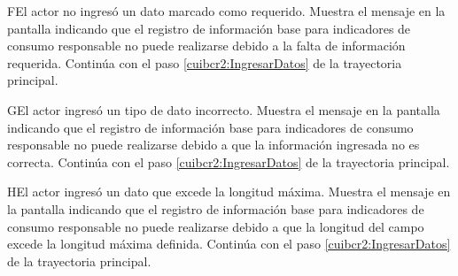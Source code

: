     \begin{UCtrayectoriaA}{F}{El actor no ingresó un dato marcado como requerido.}    
    \UCpaso[\UCsist] Muestra el mensaje  en la pantalla  indicando que el registro de información base para indicadores de consumo responsable no puede realizarse debido a la falta de información requerida.
    \UCpaso[] Continúa con el paso \ref{cuibcr2:IngresarDatos} de la trayectoria principal.     
    \end{UCtrayectoriaA}
 
        \begin{UCtrayectoriaA}{G}{El actor ingresó un tipo de dato incorrecto.}    
    \UCpaso[\UCsist] Muestra el mensaje  en la pantalla  indicando que el registro de información base para indicadores de consumo responsable no puede realizarse debido a que la información ingresada no es correcta.
    \UCpaso[] Continúa con el paso \ref{cuibcr2:IngresarDatos} de la trayectoria principal.     
    \end{UCtrayectoriaA}
    
            \begin{UCtrayectoriaA}{H}{El actor ingresó un dato que excede la longitud máxima.}    
    \UCpaso[\UCsist] Muestra el mensaje  en la pantalla  indicando que el registro de información base para indicadores de consumo responsable no puede realizarse debido a que la longitud del campo excede la longitud máxima definida.
    \UCpaso[] Continúa con el paso \ref{cuibcr2:IngresarDatos} de la trayectoria principal.     
    \end{UCtrayectoriaA}